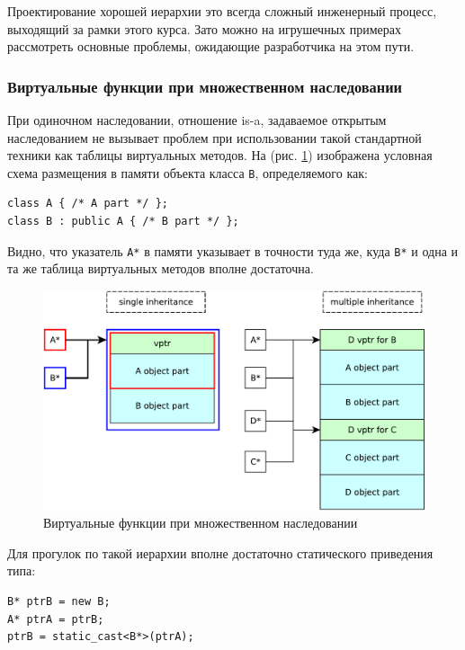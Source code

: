 \documentclass[a4paper,12pt,oneside]{article}
\begin{document}
Проектирование хорошей иерархии это всегда сложный инженерный процесс, выходящий за рамки этого курса. Зато можно на игрушечных примерах рассмотреть основные проблемы, ожидающие разработчика на этом пути.

\subsubsection{Виртуальные функции при множественном наследовании}\label{VirtThunks}

При одиночном наследовании, отношение is-a, задаваемое открытым наследованием не вызывает проблем при использовании такой стандартной техники как таблицы виртуальных методов. На (рис. \ref{fig:multinh-crop}) изображена условная схема размещения в памяти объекта класса \lstinline!B!, определяемого как:

\begin{lstlisting}
class A { /* A part */ };
class B : public A { /* B part */ };
\end{lstlisting}

Видно, что указатель \lstinline!A*! в памяти указывает в точности туда же, куда \lstinline!B*! и одна и та же таблица виртуальных методов вполне достаточна.

\begin{figure}[h!]
\centering
\includegraphics[width=1.0\textwidth]{illustrations/multinh-crop.pdf}
\caption{Виртуальные функции при множественном наследовании}
\label{fig:multinh-crop}
\end{figure}

Для прогулок по такой иерархии вполне достаточно статического приведения типа:

\begin{lstlisting}
B* ptrB = new B;
A* ptrA = ptrB;
ptrB = static_cast<B*>(ptrA);
\end{lstlisting}
\end{document}
